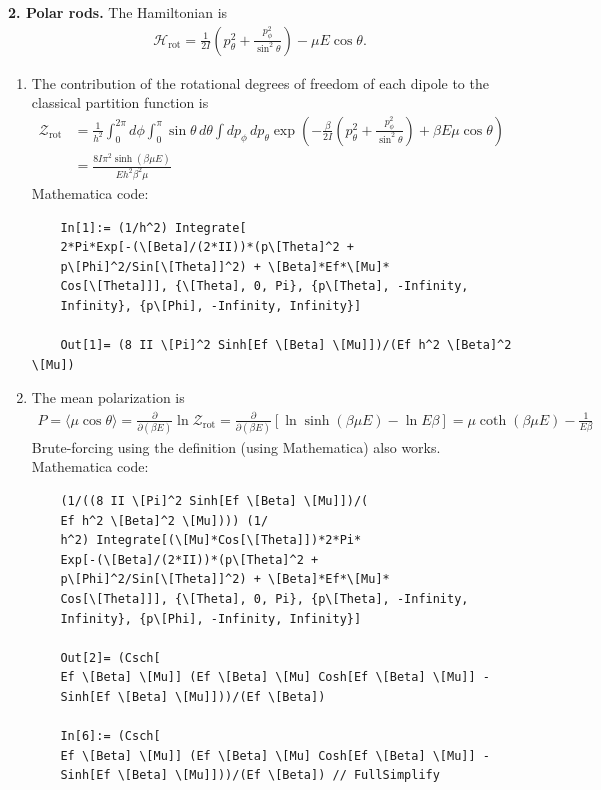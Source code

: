 \documentclass{article}
\theoremstyle{definition}
\newcommand{\p}{\partial}
\newcommand{\ham}{\mathcal{H}}
\newcommand{\be}{\beta}
\newcommand{\f}[2]{\frac{#1}{#2}}
\newcommand{\lp}{\left(}
\newcommand{\rp}{\right)}
\newcommand{\lb}{\left[}
\newcommand{\rb}{\right]}
\begin{document}
\noindent \textbf{2. Polar rods.} The Hamiltonian is 
\begin{align*}
\ham_\text{rot} = \f{1}{2I}\lp p_\theta^2 + \f{p_\phi^2}{\sin^2\theta} \rp - \mu E \cos\theta. 
\end{align*}

\begin{enumerate}[label=(\alph*)]
	
	
	\item The contribution of the rotational degrees of freedom of each dipole to the
	classical partition function is 
	\begin{align*}
	\mathcal{Z}_\text{rot} 
	&= \f{1}{h^2}\int^{2\pi}_0 d\phi \int^\pi_0 \sin\theta\,d\theta \int dp_\phi\,dp_\theta \exp\lp -\f{\be}{2I} \lp p^2_\theta + \f{p_\phi^2}{\sin^2\theta}\rp + \be E\mu\cos\theta\rp\\
	&= \boxed{\f{8I\pi^2\sinh(\be\mu E)}{Eh^2\be^2 \mu}}
 	\end{align*}
 	Mathematica code:
 	\begin{lstlisting}
 	In[1]:= (1/h^2) Integrate[
 	2*Pi*Exp[-(\[Beta]/(2*II))*(p\[Theta]^2 + 
 	p\[Phi]^2/Sin[\[Theta]]^2) + \[Beta]*Ef*\[Mu]*
 	Cos[\[Theta]]], {\[Theta], 0, Pi}, {p\[Theta], -Infinity, 
 	Infinity}, {p\[Phi], -Infinity, Infinity}]
 	
 	Out[1]= (8 II \[Pi]^2 Sinh[Ef \[Beta] \[Mu]])/(Ef h^2 \[Beta]^2 \[Mu])
 	\end{lstlisting}
	
	\item The mean polarization is 
	\begin{align*}
	P = \langle \mu \cos\theta \rangle = \f{\p}{\p (\be E)}\ln \mathcal{Z}_\text{rot} = \f{\p}{\p (\be E)}\lb \ln \sinh(\be \mu E) - \ln E\be \rb = \boxed{\mu \coth(\be \mu E) - \f{1}{E\be}}
	\end{align*}
	Brute-forcing using the definition (using Mathematica) also works. Mathematica code:
	\begin{lstlisting}
	(1/((8 II \[Pi]^2 Sinh[Ef \[Beta] \[Mu]])/(
	Ef h^2 \[Beta]^2 \[Mu]))) (1/
	h^2) Integrate[(\[Mu]*Cos[\[Theta]])*2*Pi*
	Exp[-(\[Beta]/(2*II))*(p\[Theta]^2 + 
	p\[Phi]^2/Sin[\[Theta]]^2) + \[Beta]*Ef*\[Mu]*
	Cos[\[Theta]]], {\[Theta], 0, Pi}, {p\[Theta], -Infinity, 
	Infinity}, {p\[Phi], -Infinity, Infinity}]
	
	Out[2]= (Csch[
	Ef \[Beta] \[Mu]] (Ef \[Beta] \[Mu] Cosh[Ef \[Beta] \[Mu]] - 
	Sinh[Ef \[Beta] \[Mu]]))/(Ef \[Beta])
	
	In[6]:= (Csch[
	Ef \[Beta] \[Mu]] (Ef \[Beta] \[Mu] Cosh[Ef \[Beta] \[Mu]] - 
	Sinh[Ef \[Beta] \[Mu]]))/(Ef \[Beta]) // FullSimplify
	

\end{lstlisting}
\end{enumerate}
\end{document}
